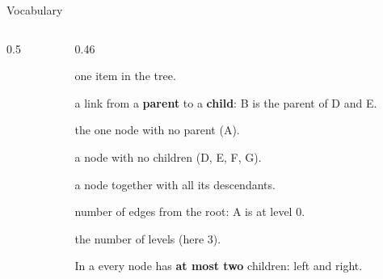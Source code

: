\documentclass[aspectratio=169,10pt]{beamer}
\newcommand{\fA}{white}\newcommand{\fB}{white}\newcommand{\fC}{white}\newcommand{\fD}{white}
\newcommand{\fE}{white}\newcommand{\fF}{white}\newcommand{\fG}{white}
\newcommand{\bsttree}[7]{%
  \node[tn,fill=\fA] (a) at (0,0) {#1};
  \node[tn,fill=\fB] (b) at (-2,-1.15) {#2};  \node[tn,fill=\fC] (c) at (2,-1.15) {#3};
  \node[tn,fill=\fD] (d) at (-3,-2.3) {#4};   \node[tn,fill=\fE] (e) at (-1,-2.3) {#5};
  \node[tn,fill=\fF] (f) at (1,-2.3) {#6};    \node[tn,fill=\fG] (g) at (3,-2.3) {#7};
  \foreach \p/\q in {a/b,a/c,b/d,b/e,c/f,c/g}{\draw[tdInk!60] (\p) -- (\q);}}
\begin{document}
\begin{frame}{Vocabulary}
\begin{columns}[T]
\begin{column}{0.5\textwidth}
\begin{sfig}[0.7]
\end{sfig}
\end{column}
\begin{column}{0.46\textwidth}
{\small
\begin{description}\setlength\itemsep{2pt}
\item[node] one item in the tree.
\item[edge] a link from a \textbf{parent} to a \textbf{child}: B is the parent of D and E.
\item[root] the one node with no parent (A).
\item[leaf] a node with no children (D, E, F, G).
\item[subtree] a node together with all its descendants.
\item[depth / level] number of edges from the root: A is at level 0.
\item[height] the number of levels (here 3).
\end{description}
In a  every node has \textbf{at most two} children: left and right.}
\end{column}
\end{columns}
\end{frame}
\end{document}
